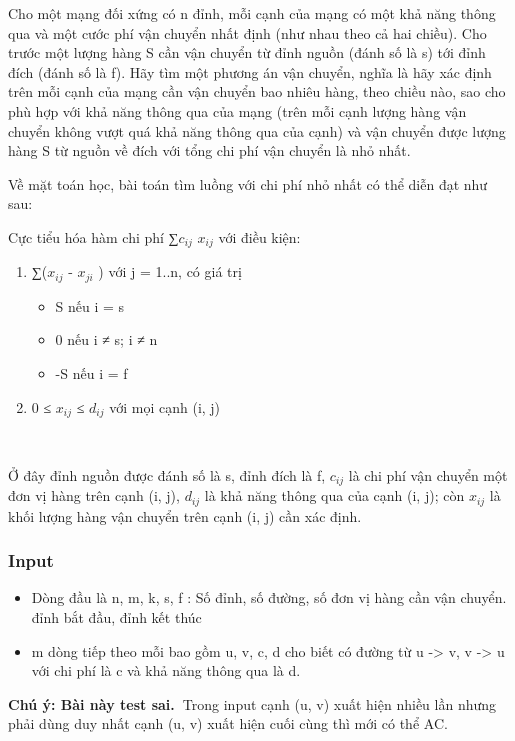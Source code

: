 

Cho một mạng đối xứng có n đỉnh, mỗi cạnh của mạng có một khả năng thông qua và một cước phí vận chuyển nhất định (như nhau theo cả hai chiều). Cho trước một lượng hàng S cần vận chuyển từ đỉnh nguồn (đánh số là s) tới đỉnh đích (đánh số là f). Hãy tìm một phương án vận chuyển, nghĩa là hãy xác định trên mỗi cạnh của mạng cần vận chuyển bao nhiêu hàng, theo chiều nào, sao cho phù hợp với khả năng thông qua của mạng (trên mỗi cạnh lượng hàng vận chuyển không vượt quá khả năng thông qua của cạnh) và vận chuyển được lượng hàng S từ nguồn về đích với tổng chi phí vận chuyển là nhỏ nhất.


Về mặt toán học, bài toán tìm luồng với chi phí nhỏ nhất có thể diễn đạt như sau:

Cực tiểu hóa hàm chi phí ∑$c_{ij}$ $x_{ij}$ với điều kiện:
\begin{enumerate}
	\item ∑($x_{ij}$ - $x_{ji}$ ) với j = 1..n, có giá trị
\begin{itemize}
	\item S nếu i = s
	\item 0 nếu i ≠ s; i ≠ n
	\item -S nếu i = f
\end{itemize}
	\item 0 ≤ $x_{ij}$ ≤ $d_{ij}$ với mọi cạnh (i, j)

 
\end{enumerate}

Ở đây đỉnh nguồn được đánh số là s, đỉnh đích là f, $c_{ij}$ là chi phí vận chuyển một đơn vị hàng trên cạnh (i, j), $d_{ij}$ là khả năng thông qua của cạnh (i, j); còn $x_{ij}$ là khối lượng hàng vận chuyển trên cạnh (i, j) cần xác định.

\subsubsection{Input}
\begin{itemize}
	\item Dòng đầu là n, m, k, s, f : Số đỉnh, số đường, số đơn vị hàng cần vận chuyển. đỉnh bắt đầu, đỉnh kết thúc
	\item m dòng tiếp theo mỗi bao gồm u, v, c, d cho biết có đường từ u -> v, v -> u với chi phí là c và khả năng thông qua là d.
\end{itemize}

\textbf{Chú ý: Bài này test sai. }Trong input cạnh (u, v) xuất hiện nhiều lần nhưng phải dùng duy nhất cạnh (u, v) xuất hiện cuối cùng thì mới có thể AC.

